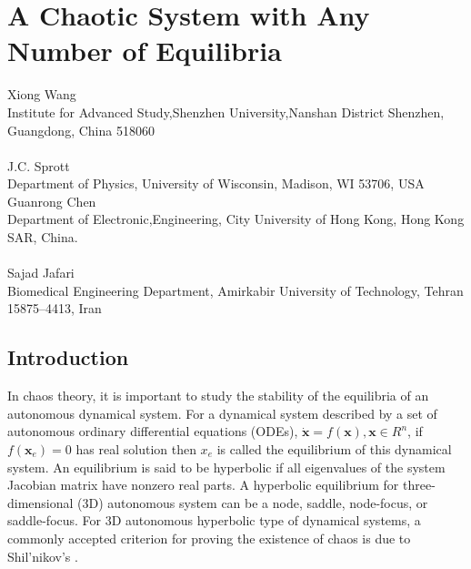 \chapter{A Chaotic System with Any Number of Equilibria}
\label{chap:anynum_equi}

\begin{pauthor}
  Xiong Wang \\
  Institute for Advanced Study,Shenzhen University,Nanshan District Shenzhen, Guangdong, China 518060\\
  \\
  J.C. Sprott\\
  Department of Physics, University of Wisconsin, Madison, WI 53706, USA\\
  Guanrong Chen\\
  Department of Electronic,Engineering, City University of Hong Kong, Hong Kong SAR, China.\\
  \\
  Sajad Jafari\\
Biomedical Engineering Department, Amirkabir University of Technology, Tehran
15875–4413, Iran\\
\end{pauthor}



\section{Introduction}
\label{sec:any_intro}

In chaos theory, it is important to study the stability of the equilibria of an autonomous dynamical system.
For a dynamical system described by a set of autonomous ordinary differential equations (ODEs),
\(\dot{\textbf{x}} = f(\textbf{x}), \textbf{x}\in R^n\), if \(f(\textbf{x}_e)=0\) has real solution then \(x_e\) is called the equilibrium of this
dynamical system. An equilibrium is said to be hyperbolic if all eigenvalues of the system
Jacobian matrix have nonzero real parts. A hyperbolic equilibrium for three-dimensional (3D) autonomous system can be a node, saddle,
node-focus, or saddle-focus. For 3D autonomous hyperbolic type of dynamical systems,
a commonly accepted criterion for proving
the existence of chaos is due to Shil'nikov's \cite{Ovsyannikov1987On,L1970Sil,Shil2011Normal,Shilnikov1998Methods,BAOYING2011AN}.

